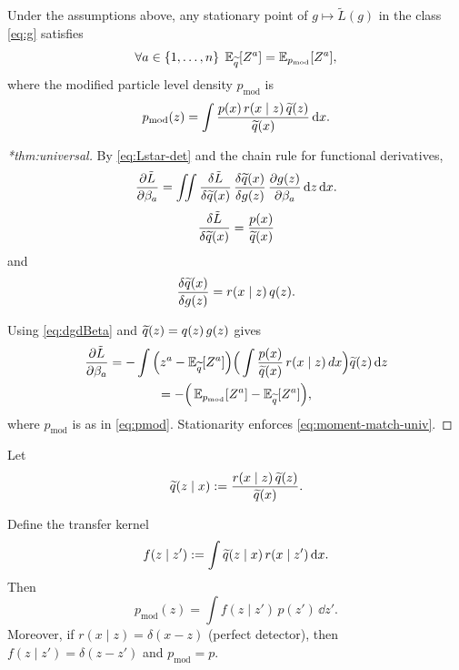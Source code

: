\begin{theorem}\label{thm:universal}
Under the assumptions above, any stationary point of $g\mapsto \tilde L(g)$ in the class \cref{eq:g} satisfies
\begin{equation}\label{eq:moment-match-univ}
    \forall a\in \qty{1, \dots, n}\;\operatorname{\mathbb{E}}_{\widetilde{q}}[Z^a] = \operatorname{\mathbb{E}}_{p_{\mathrm{mod}}}[Z^a],
\end{equation}
where the modified particle level density $p_{\mathrm{mod}}$ is
\begin{equation}\label{eq:pmod}
    p_{\mathrm{mod}}(z) = \int \frac{p(x)\,r(x\mid z)\,\widetilde{q}(z)}{\widetilde{q}(x)}\,\dd x.
\end{equation}
\end{theorem}

\begin{proof}[*thm:universal]
By \cref{eq:Lstar-det} and the chain rule for functional derivatives,
\[
\frac{\partial \tilde L}{\partial \beta_a}
=\iint \frac{\delta \tilde L}{\delta \widetilde{q}(x)}\,
      \frac{\delta \widetilde{q}(x)}{\delta g(z)}\,
      \frac{\partial g(z)}{\partial \beta_a}\,\dd z\,\dd x.
\]
\[\frac{\delta \tilde L}{\delta \widetilde{q}(x)}=\frac{p(x)}{\widetilde{q}(x)}
\]
and
\[
    \frac{\delta \widetilde{q}(x)}{\delta g(z)} = r(x\mid z)\,q(z).
\]

Using \cref{eq:dgdBeta} and $\widetilde{q}(z)=q(z)\,g(z)$ gives
\begin{gather}
\frac{\partial \tilde L}{\partial \beta_a}
= -\int \Big(z^a-\operatorname{\mathbb{E}}_{\widetilde{q}}[Z^a]\Big)
       \Big(\int \frac{p(x)}{\widetilde{q}(x)}\,r(x\mid z)\,dx\Big)\widetilde{q}(z)\,\dd z\\
= -\Big(\operatorname{\mathbb{E}}_{p_{\mathrm{mod}}}[Z^a]-\operatorname{\mathbb{E}}_{\widetilde{q}}[Z^a]\Big),
\end{gather}
where $p_{\mathrm{mod}}$ is as in \cref{eq:pmod}. Stationarity enforces \cref{eq:moment-match-univ}.
\end{proof}

\begin{theorem}\label{prop:transfer}
Let
\begin{equation}\label{eq:qinv}
    \widetilde{q}(z\mid x) :=\frac{r(x\mid z)\,\widetilde{q}(z)}{\widetilde{q}(x)}.
\end{equation}

Define the transfer kernel
\begin{equation}\label{eq:f}
    f(z\mid z') := \int \widetilde{q}(z\mid x)\,r(x\mid z')\,\dd x.
\end{equation}
Then
\begin{equation}\label{eq:pmod-transfer}
    p_{\mathrm{mod}}(z) = \int f(z\mid z')\,p(z')\,\dd z'.
\end{equation}
Moreover, if $r(x\mid z)=\delta(x-z)$ (perfect detector), then $f(z\mid z')=\delta(z-z')$ and $p_{\mathrm{mod}}=p$.
\end{theorem}

